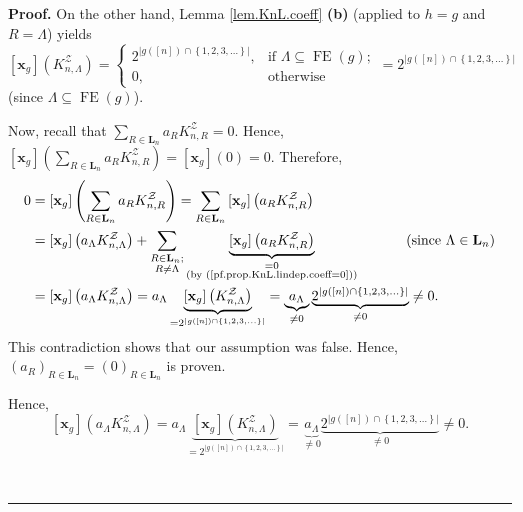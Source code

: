 \documentclass[numbers=enddot,12pt,final,onecolumn,notitlepage]{scrartcl}%
\theoremstyle{definition}
\newenvironment{proof}[1][Proof]{\noindent\textbf{#1.} }{\ \rule{0.5em}{0.5em}}
\newenvironment{verlong}{}{}
\newenvironment{vershort}{}{}
\let\sumnonlimits\sum
\renewcommand{\sum}{\sumnonlimits\limits}
\begin{document}
\begin{proof}
On the other hand, Lemma \ref{lem.KnL.coeff} \textbf{(b)} (applied to $h=g$
and $R=\Lambda$) yields%
\[
\left[  \mathbf{x}_{g}\right]  \left(  K_{n,\Lambda}^{\mathcal{Z}}\right)  =%
\begin{cases}
2^{\left\vert g\left(  \left[  n\right]  \right)  \cap\left\{  1,2,3,\ldots
\right\}  \right\vert }, & \text{if }\Lambda\subseteq\operatorname*{FE}\left(
g\right)  ;\\
0, & \text{otherwise}%
\end{cases}
=2^{\left\vert g\left(  \left[  n\right]  \right)  \cap\left\{  1,2,3,\ldots
\right\}  \right\vert }%
\]
(since $\Lambda\subseteq\operatorname*{FE}\left(  g\right)  $).

\begin{vershort}
Now, recall that $\sum_{R\in\mathbf{L}_{n}}a_{R}K_{n,R}^{\mathcal{Z}}=0$.
Hence, $\left[  \mathbf{x}_{g}\right]  \left(  \sum_{R\in\mathbf{L}_{n}}%
a_{R}K_{n,R}^{\mathcal{Z}}\right)  =\left[  \mathbf{x}_{g}\right]  \left(
0\right)  =0$. Therefore,%
\begin{align*}
0 &  =\left[  \mathbf{x}_{g}\right]  \left(  \sum_{R\in\mathbf{L}_{n}}%
a_{R}K_{n,R}^{\mathcal{Z}}\right)  =\sum_{R\in\mathbf{L}_{n}}\left[
\mathbf{x}_{g}\right]  \left(  a_{R}K_{n,R}^{\mathcal{Z}}\right)  \\
&  =\left[  \mathbf{x}_{g}\right]  \left(  a_{\Lambda}K_{n,\Lambda
}^{\mathcal{Z}}\right)  +\sum_{\substack{R\in\mathbf{L}_{n};\\R\neq\Lambda
}}\underbrace{\left[  \mathbf{x}_{g}\right]  \left(  a_{R}K_{n,R}%
^{\mathcal{Z}}\right)  }_{\substack{=0\\\text{(by
(\ref{pf.prop.KnL.lindep.coeff=0}))}}}\ \ \ \ \ \ \ \ \ \ \left(  \text{since
}\Lambda\in\mathbf{L}_{n}\right)  \\
&  =\left[  \mathbf{x}_{g}\right]  \left(  a_{\Lambda}K_{n,\Lambda
}^{\mathcal{Z}}\right)  =a_{\Lambda}\underbrace{\left[  \mathbf{x}_{g}\right]
\left(  K_{n,\Lambda}^{\mathcal{Z}}\right)  }_{=2^{\left\vert g\left(  \left[
n\right]  \right)  \cap\left\{  1,2,3,\ldots\right\}  \right\vert }%
}=\underbrace{a_{\Lambda}}_{\neq0}\underbrace{2^{\left\vert g\left(  \left[
n\right]  \right)  \cap\left\{  1,2,3,\ldots\right\}  \right\vert }}_{\neq
0}\neq0.
\end{align*}
This contradiction shows that our assumption was false. Hence, $\left(
a_{R}\right)  _{R\in\mathbf{L}_{n}}=\left(  0\right)  _{R\in\mathbf{L}_{n}}$
is proven.
\end{vershort}

\begin{verlong}
Hence,%
\[
\left[  \mathbf{x}_{g}\right]  \left(  a_{\Lambda}K_{n,\Lambda}^{\mathcal{Z}%
}\right)  =a_{\Lambda}\underbrace{\left[  \mathbf{x}_{g}\right]  \left(
K_{n,\Lambda}^{\mathcal{Z}}\right)  }_{=2^{\left\vert g\left(  \left[
n\right]  \right)  \cap\left\{  1,2,3,\ldots\right\}  \right\vert }%
}=\underbrace{a_{\Lambda}}_{\neq0}\underbrace{2^{\left\vert g\left(  \left[
n\right]  \right)  \cap\left\{  1,2,3,\ldots\right\}  \right\vert }}_{\neq
0}\neq0.
\]



\end{verlong}
\end{proof}
\end{document}
